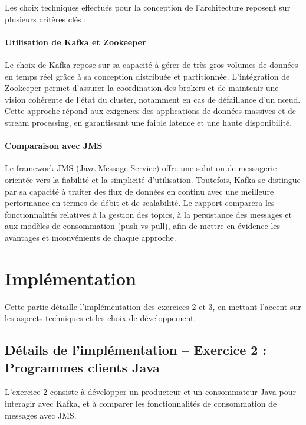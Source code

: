 Les choix techniques effectués pour la conception de l’architecture reposent sur plusieurs critères clés :

\paragraph{Utilisation de Kafka et Zookeeper}
Le choix de Kafka repose sur sa capacité à gérer de très gros volumes de données en temps réel grâce à sa conception distribuée et partitionnée.
L’intégration de Zookeeper permet d’assurer la coordination des brokers et de maintenir une vision cohérente de l’état du cluster, notamment en cas de défaillance d’un nœud. Cette approche répond aux exigences des applications de données massives et de stream processing, en garantissant une faible latence et une haute disponibilité.

\paragraph{Comparaison avec JMS}
Le framework JMS (Java Message Service) offre une solution de messagerie orientée vers la fiabilité et la simplicité d’utilisation.
Toutefois, Kafka se distingue par sa capacité à traiter des flux de données en continu avec une meilleure performance en termes de débit et de scalabilité. Le rapport comparera les fonctionnalités relatives à la gestion des topics, à la persistance des messages et aux modèles de consommation (push vs pull), afin de mettre en évidence les avantages et inconvénients de chaque approche.


\section{Implémentation}\label{sec:implementation}

Cette partie détaille l’implémentation des exercices 2 et 3, en mettant l’accent sur les aspects techniques et les choix de développement.

\subsection{Détails de l’implémentation – Exercice 2 : Programmes clients Java}\label{subsec:details-de-limplementation--exercice-2-:-programmes-clients-java}

L'exercice 2 consiste à développer un producteur et un consommateur Java pour interagir avec Kafka, et à comparer les fonctionnalités de consommation de messages avec JMS.

